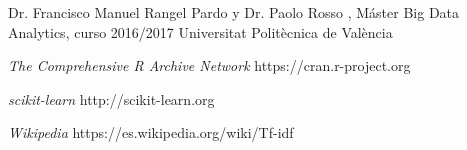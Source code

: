 \documentclass[11pt,a4paper]{article}
\begin{document}
\begin{thebibliography}{}

Dr. Francisco Manuel Rangel Pardo y Dr. Paolo Rosso
, M\'aster Big Data Analytics, curso 2016/2017
\newblock Universitat Polit\`ecnica de Val\`encia

{\em The Comprehensive R Archive Network}
\newblock https://cran.r-project.org

{\em scikit-learn}
\newblock http://scikit-learn.org

{\em Wikipedia }
\newblock https://es.wikipedia.org/wiki/Tf-idf

\end{thebibliography}
\end{document}
